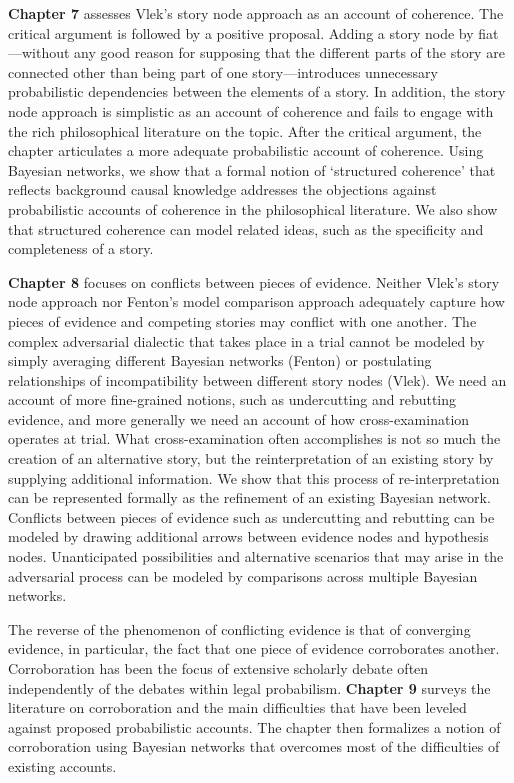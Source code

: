 \documentclass[
  10pt,
  dvipsnames,enabledeprecatedfontcommands]{scrartcl}
\begin{document}
\textbf{Chapter 7} assesses Vlek's story node approach as an account of
coherence. The critical argument is followed by a positive proposal.
Adding a story node by fiat---without any good reason for supposing that
the different parts of the story are connected other than being part of
one story---introduces unnecessary probabilistic dependencies between
the elements of a story. In addition, the story node approach is
simplistic as an account of coherence and fails to engage with the rich
philosophical literature on the topic. After the critical argument, the
chapter articulates a more adequate probabilistic account of coherence.
Using Bayesian networks, we show that a formal notion of `structured
coherence' that reflects background causal knowledge addresses the
objections against probabilistic accounts of coherence in the
philosophical literature. We also show that structured coherence can
model related ideas, such as the specificity and completeness of a
story.

\textbf{Chapter 8} focuses on conflicts between pieces of evidence.
Neither Vlek's story node approach nor Fenton's model comparison
approach adequately capture how pieces of evidence and competing stories
may conflict with one another. The complex adversarial dialectic that
takes place in a trial cannot be modeled by simply averaging different
Bayesian networks (Fenton) or postulating relationships of
incompatibility between different story nodes (Vlek). We need an account
of more fine-grained notions, such as undercutting and rebutting
evidence, and more generally we need an account of how cross-examination
operates at trial. What cross-examination often accomplishes is not so
much the creation of an alternative story, but the reinterpretation of
an existing story by supplying additional information. We show that this
process of re-interpretation can be represented formally as the
refinement of an existing Bayesian network. Conflicts between pieces of
evidence such as undercutting and rebutting can be modeled by drawing
additional arrows between evidence nodes and hypothesis nodes.
Unanticipated possibilities and alternative scenarios that may arise in
the adversarial process can be modeled by comparisons across multiple
Bayesian networks.

The reverse of the phenomenon of conflicting evidence is that of
converging evidence, in particular, the fact that one piece of evidence
corroborates another. Corroboration has been the focus of extensive
scholarly debate often independently of the debates within legal
probabilism. \textbf{Chapter 9} surveys the literature on corroboration
and the main difficulties that have been leveled against proposed
probabilistic accounts. The chapter then formalizes a notion of
corroboration using Bayesian networks that overcomes most of the
difficulties of existing accounts.
\end{document}
